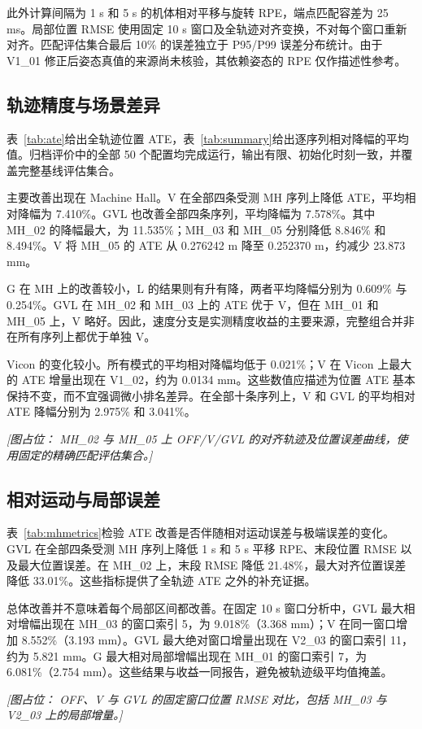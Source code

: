 \documentclass[a4paper,runningheads]{llncs}
\newcommand{\placeholder}[1]{\par\smallskip\noindent\textit{[图占位： #1]}\par\smallskip}
\begin{document}
此外计算间隔为 1 s 和 5 s 的机体相对平移与旋转 RPE，端点匹配容差为 25 ms。局部位置 RMSE 使用固定 10 s 窗口及全轨迹对齐变换，不对每个窗口重新对齐。匹配评估集合最后 10\% 的误差独立于 P95/P99 误差分布统计。由于 V1\_01 修正后姿态真值的来源尚未核验，其依赖姿态的 RPE 仅作描述性参考。

\subsection{轨迹精度与场景差异}
表~\ref{tab:ate}给出全轨迹位置 ATE，表~\ref{tab:summary}给出逐序列相对降幅的平均值。归档评价中的全部 50 个配置均完成运行，输出有限、初始化时刻一致，并覆盖完整基线评估集合。



主要改善出现在 Machine Hall。V 在全部四条受测 MH 序列上降低 ATE，平均相对降幅为 7.410\%。GVL 也改善全部四条序列，平均降幅为 7.578\%。其中 MH\_02 的降幅最大，为 11.535\%；MH\_03 和 MH\_05 分别降低 8.846\% 和 8.494\%。V 将 MH\_05 的 ATE 从 0.276242 m 降至 0.252370 m，约减少 23.873 mm。

G 在 MH 上的改善较小，L 的结果则有升有降，两者平均降幅分别为 0.609\% 与 0.254\%。GVL 在 MH\_02 和 MH\_03 上的 ATE 优于 V，但在 MH\_01 和 MH\_05 上，V 略好。因此，速度分支是实测精度收益的主要来源，完整组合并非在所有序列上都优于单独 V。

Vicon 的变化较小。所有模式的平均相对降幅均低于 0.021\%；V 在 Vicon 上最大的 ATE 增量出现在 V1\_02，约为 0.0134 mm。这些数值应描述为位置 ATE 基本保持不变，而不宜强调微小排名差异。在全部十条序列上，V 和 GVL 的平均相对 ATE 降幅分别为 2.975\% 和 3.041\%。

\placeholder{MH\_02 与 MH\_05 上 OFF/V/GVL 的对齐轨迹及位置误差曲线，使用固定的精确匹配评估集合。}

\subsection{相对运动与局部误差}
表~\ref{tab:mhmetrics}检验 ATE 改善是否伴随相对运动误差与极端误差的变化。GVL 在全部四条受测 MH 序列上降低 1 s 和 5 s 平移 RPE、末段位置 RMSE 以及最大位置误差。在 MH\_02 上，末段 RMSE 降低 21.48\%，最大对齐位置误差降低 33.01\%。这些指标提供了全轨迹 ATE 之外的补充证据。


总体改善并不意味着每个局部区间都改善。在固定 10 s 窗口分析中，GVL 最大相对增幅出现在 MH\_03 的窗口索引 5，为 9.018\%（3.368 mm）；V 在同一窗口增加 8.552\%（3.193 mm）。GVL 最大绝对窗口增量出现在 V2\_03 的窗口索引 11，约为 5.821 mm。G 最大相对局部增幅出现在 MH\_01 的窗口索引 7，为 6.081\%（2.754 mm）。这些结果与收益一同报告，避免被轨迹级平均值掩盖。
\placeholder{OFF、V 与 GVL 的固定窗口位置 RMSE 对比，包括 MH\_03 与 V2\_03 上的局部增量。}
\end{document}
